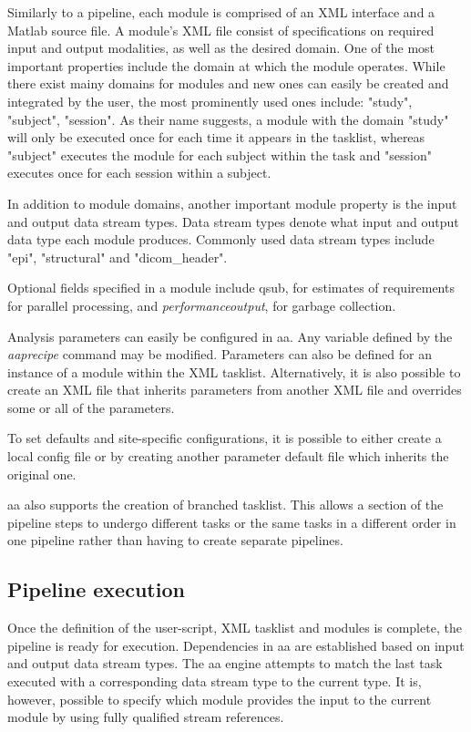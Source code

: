 \documentclass{report}
\begin{document}
    Similarly to a pipeline, each module is comprised of an XML interface and a
    Matlab source file. A module's XML file consist of specifications on
    required input and output modalities, as well as the desired domain. One of
    the most important properties include the domain at which the module
    operates. While there exist mainy domains for modules and new ones can
    easily be created and integrated by the user, the most prominently used ones
    include: "study", "subject", "session". As their name suggests, a module
    with the domain "study" will only be executed once for each time it appears
    in the tasklist, whereas "subject" executes the module for each subject
    within the task and "session" executes once for each session within a
    subject. 
 
    In addition to module domains, another important module property is the
    input and output data stream types. Data stream types denote what input and
    output data type each module produces. Commonly used data stream types
    include "epi", "structural" and "dicom\_header".

    Optional fields specified in a module include qsub, for estimates of
    requirements for parallel processing, and \textit{performanceoutput}, for
    garbage collection.  

   Analysis parameters can easily be configured in aa. Any variable defined by
   the \textit{aaprecipe} command may be modified. Parameters can also be
   defined for an instance of a module within the XML tasklist. Alternatively,
   it is also possible to create an XML file that inherits parameters from
   another XML file and overrides some or all of the parameters.

   To set defaults and site-specific configurations, it is possible to either
   create a local config file or by creating another parameter default file
   which inherits the original one.   

    aa also supports the creation of branched tasklist. This allows a section of
    the pipeline steps to undergo different tasks or the same tasks in a
    different order in one pipeline rather than having to create separate
    pipelines.

        \subsection{Pipeline execution} Once the definition of the user-script,
        XML tasklist and modules is complete, the pipeline is ready for
        execution. Dependencies in aa are established based on input and output
        data stream types. The aa engine attempts to match the last task
        executed with a corresponding data stream type to the current type. It
        is, however, possible to specify which module provides the input to the
        current module by using fully qualified stream references.
\end{document}
